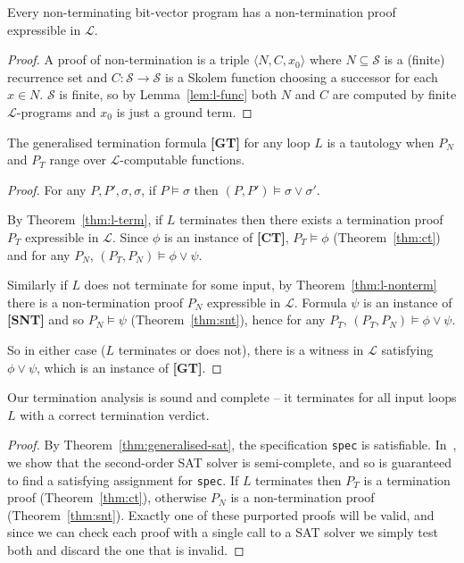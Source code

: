 \documentclass[a4paper]{llncs}
\begin{document}
\begin{theorem}
\label{thm:l-nonterm}
 Every non-terminating bit-vector program has a non-termination proof expressible in $\mathcal{L}$.
\end{theorem}

\begin{proof}
 A proof of non-termination is a triple $\langle N, C, x_0 \rangle$ where
 \mbox{$N \subseteq \mathcal{S}$} is a (finite) recurrence set and
 $C : \mathcal{S} \to \mathcal{S}$ is a Skolem function choosing
 a successor for each $x \in N$.  $\mathcal{S}$ is finite, so by Lemma~\ref{lem:l-func} both
 $N$ and $C$ are computed by finite $\mathcal{L}$-programs and $x_0$ is just a ground term.
\end{proof}

\begin{theorem}
 \label{thm:generalised-sat}
 The generalised termination formula {\bf [GT]} for any loop $L$ is a tautology
 when $P_N$ and $P_T$ range over \mbox{$\mathcal{L}$-computable} functions.
\end{theorem}

\begin{proof}
 For any $P, P', \sigma, \sigma$, if $P \models \sigma$ then $(P, P') \models \sigma \vee \sigma'$.

 By Theorem~\ref{thm:l-term}, if $L$ terminates then there exists a termination proof $P_T$ expressible
 in $\mathcal{L}$.  Since $\phi$ is an instance of {\bf [CT]}, $P_T \models \phi$ (Theorem~\ref{thm:ct}) and
 for any $P_N$, $(P_T, P_N) \models \phi \vee \psi$.

 Similarly if $L$ does not terminate for some input, by Theorem~\ref{thm:l-nonterm} there is a non-termination
 proof $P_N$ expressible in $\mathcal{L}$.  Formula $\psi$ is an instance of {\bf [SNT]} and so $P_N \models \psi$
 (Theorem~\ref{thm:snt}), hence for any $P_T$, $(P_T, P_N) \models \phi \vee \psi$.

 So in either case ($L$ terminates or does not), there is a witness in $\mathcal{L}$ satisfying
 $\phi \vee \psi$, which is an instance of {\bf [GT]}.
\end{proof}

\begin{theorem}
Our termination analysis %
is sound and complete -- it terminates for all input loops $L$ with
 a correct termination verdict.
\end{theorem}

\begin{proof}
 By Theorem~\ref{thm:generalised-sat}, the specification \lstinline!spec! is satisfiable.
 In~\cite{kalashnikov}, we show that the second-order SAT solver is semi-complete, and so is guaranteed to find a satisfying
 assignment for \lstinline!spec!. %
 If $L$ terminates then $P_T$ is a termination proof (Theorem~\ref{thm:ct}),
 otherwise $P_N$ is a non-termination proof (Theorem~\ref{thm:snt}).  Exactly one of these purported proofs
 will be valid, and since we can check each proof with a single call to a SAT solver we simply
 test both and discard the one that is invalid.
\end{proof}
\end{document}
